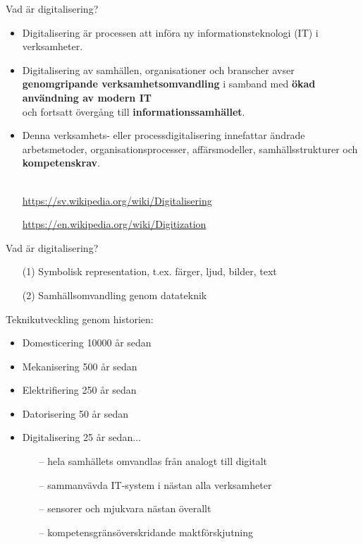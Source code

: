 \documentclass[aspectratio=169]{beamer}
\newenvironment{Slide}[1]%
  {\begin{frame}[environment=Slide]{#1}}
  {\end{frame}}%
\begin{document}
\begin{Slide}{Vad är digitalisering?}
  \begin{itemize}\small
      \item Digitalisering är processen att införa ny informationsteknologi (IT) i
      verksamheter. 
      \item Digitalisering av samhällen, organisationer och
      branscher avser \textbf{genomgripande verksamhetsomvandling} i samband
      med \textbf{ökad användning av modern IT} \\ och fortsatt övergång till
      \textbf{informationssamhället}. 
      
      \item Denna verksamhets- eller processdigitalisering innefattar ändrade arbetsmetoder,
      organisationsprocesser, affärsmodeller, samhällsstrukturer och
      \textbf{kompetenskrav}.
    \end{itemize}

    \begin{itemize}\small
      \item[]  ~\\\url{https://sv.wikipedia.org/wiki/Digitalisering}
      \item[]  \url{https://en.wikipedia.org/wiki/Digitization}
  \end{itemize}
\end{Slide}


\begin{Slide}{Vad är digitalisering?}
  \begin{itemize}
    \item[(1)] Symbolisk representation, t.ex. färger, ljud, bilder, text
    \item[(2)] Samhällsomvandling genom datateknik
  \end{itemize}
  \pause
  \vspace{1em}
  Teknikutveckling genom historien:
  \begin{itemize}
    \item Domesticering  \hfill 10000 år sedan
    \item Mekanisering \hfill 500 år sedan
    \item Elektrifiering \hfill 250 år sedan
    \item Datorisering \hfill 50 år sedan
    \item Digitalisering  \pause\hfill 25 år sedan... \hfill
    \begin{itemize}
      \item[] -- hela samhällets omvandlas från analogt till digitalt
      \item[] -- sammanvävda IT-system i nästan alla verksamheter
      \item[] -- sensorer och mjukvara nästan överallt
      \item[] -- kompetensgränsöverskridande maktförskjutning
    \end{itemize}
  \end{itemize}
  \end{Slide}
  
\end{document}
